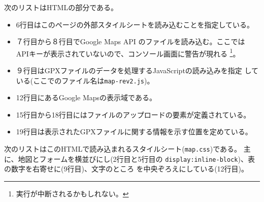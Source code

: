  次のリストはHTMLの部分である。
 \begin{itemize}
	\item 6行目はこのページの外部スタイルシートを読み込むことを指定している。
	\item ７行目から８行目でGoogle Maps API のファイルを読み込む。ここでは
				APIキーが表示されていないので、コンソール画面に警告が現れる
				\footnote{実行が中断されるかもしれない。}。
	\item ９行目はGPXファイルのデータを処理するJavaScriptの読み込みを指定
				している(ここでのファイル名は\texttt{map-rev2.js})。
	\item 12行目にあるGoogle Mapsの表示域である。
	\item 15行目から18行目にはファイルのアップロードの要素が定義されている。
	\item 19行目は表示されたGPXファイルに関する情報を示す位置を定めている。
 \end{itemize}
 次のリストはこのHTMLで読み込まれるスタイルシート(\texttt{map.css})である。
 主に、地図とフォームを横並びにし(2行目と5行目の
 \texttt{display:inline-block})、表の数字を右寄せに(9行目)、文字のところ
 を中央ぞろえにしている(12行目)。 

